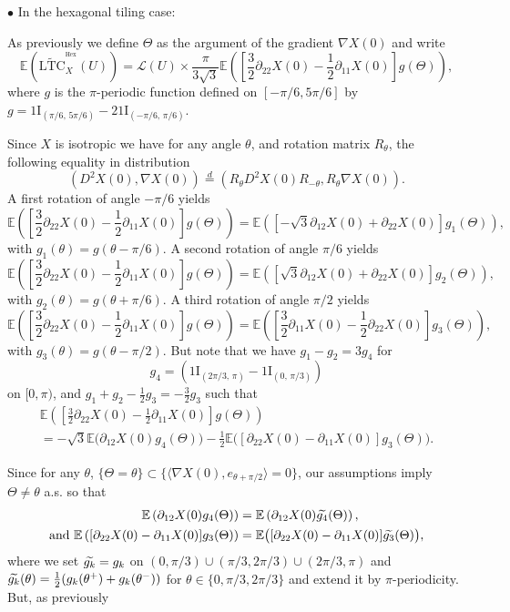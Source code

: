 \documentclass[AHL,Unicode,longabstracts,published]{cedram}
\newcommand{\E}{\mathbb{E}}
\newcommand{\ind}{{1\!\!\mathrm{I}}}
\DeclareMathOperator{\Hex}{Hex}
\newcommand{\tLTC}{\widetilde{\mathrm{LTC}}}
\newcommand{\calL}{\mathcal{L}}
\let\oldtilde\tilde
\renewcommand*{\tilde}[1]{\mathchoice{\widetilde{#1}}{\widetilde{#1}}{\oldtilde{#1}}{\oldtilde{#1}}}
\begin{document}
$\bullet$ In the hexagonal tiling case:

As previously we define $\Theta$ as the argument of the gradient $\nabla X(0)$ and write
\[
\E\left(\tLTC^{^{\Hex}}_{X}(U)\right)=\calL(U)\times
\frac{\pi}{3\sqrt{3}}\E\left(\left[\frac{3}{2}\partial_{22}X(0)
-\frac{1}{2}\partial_{11}X(0)\right]g(\Theta)\right),
\]
where $g$ is the $\pi$-periodic function defined on $[-\pi/6,5\pi/6]$ by $g=\ind_{(\pi/6,\,5\pi/6)}-2\ind_{(-\pi/6,\,\pi/6)}$.

Since $X$ is isotropic we have for any angle $\theta$, and rotation matrix $R_\theta$, the following equality in distribution
\[
\left(D^2X(0), \nabla X(0)\right)\stackrel{d}{=}\left(R_\theta D^2X(0) R_{-\theta}, R_\theta \nabla X(0)\right).
\]
A first rotation of angle $-\pi/6$ yields
\[
\E\left(\left[\frac{3}{2}\partial_{22}X(0)
-\frac{1}{2}\partial_{11}X(0)\right]g(\Theta)\right)=\E\left(\left[-\sqrt{3}\partial_{12}X(0)
+\partial_{22}X(0)\right]g_1(\Theta)\right),
\]
with $g_1(\theta)=g(\theta-\pi/6)$. A second rotation of angle $\pi/6$ yields
\[
\E\left(\left[\frac{3}{2}\partial_{22}X(0)
-\frac{1}{2}\partial_{11}X(0)\right]g(\Theta)\right)=\E\left(\left[\sqrt{3}\partial_{12}X(0)
+\partial_{22}X(0)\right]g_2(\Theta)\right),
\]
with $g_2(\theta)=g(\theta+\pi/6)$. A third rotation of angle $\pi/2$ yields
\[
\E\left(\left[\frac{3}{2}\partial_{22}X(0)
-\frac{1}{2}\partial_{11}X(0)\right]g(\Theta)\right)=\E\left(\left[\frac{3}{2}\partial_{11}X(0)
-\frac{1}{2}\partial_{22}X(0)\right]g_3(\Theta)\right),
\]
with $g_3(\theta)=g(\theta-\pi/2)$. But note that we have $g_1-g_2=3g_4$ for
\[
g_4=\left(\ind_{(2\pi/3,\,\pi)} -\ind_{(0,\,\pi/3)}\right)
\]
on $[0,\pi)$, and $g_1+g_2-\frac{1}{2}g_3=-\frac{3}{2}g_3$ such that
\begin{multline*}
\E\left(\left[\frac{3}{2}\partial_{22}X(0)
-\frac{1}{2}\partial_{11}X(0)\right]g(\Theta)\right)\\
=-\sqrt{3}\E\big(\partial_{12}X(0)g_4(\Theta)\big)-\frac{1}{2}
\E\big(\left[\partial_{22}X(0)-\partial_{11}X(0)\right]g_3(\Theta)\big).
\end{multline*}

Since for any $\theta$, $\{\Theta=\theta\}\subset \{\langle \nabla X(0),e_{\theta+\pi/2}\rangle =0\}$, our assumptions imply $\Theta \neq \theta$ a.s. so that
\begin{align*}
\E\left(\partial_{12}X(0)g_4(\Theta)\right) &=\E\left(\partial_{12}X(0)\tilde{g_4}(\Theta)\right),
\\
\text{and }
\E\left([\partial_{22}X(0)-\partial_{11}X(0)]g_3(\Theta)\right) &=\E\big([\partial_{22}X(0)-\partial_{11}X(0)]\tilde{g_3}(\Theta)\big),
\end{align*}
where we set $\tilde{g_k}=g_k$ on $(0,\pi/3)\cup (\pi/3,2\pi/3)\cup (2\pi/3,\pi)$ and $\tilde{g_k}(\theta)=\frac{1}{2}(g_k(\theta^+)+g_k(\theta^-))$ for $\theta\in \{0,\pi/3,2\pi/3\}$ and extend it by $\pi$-periodicity. But, as previously
\end{document}
